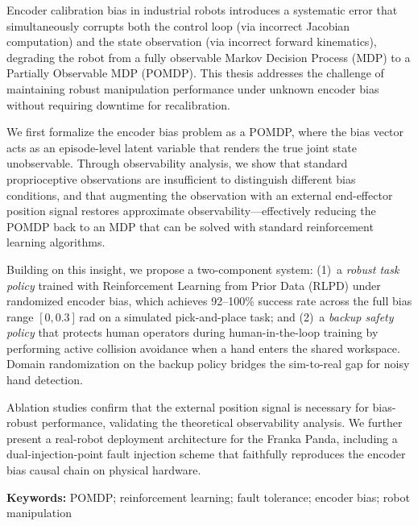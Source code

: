 
Encoder calibration bias in industrial robots introduces a systematic error that simultaneously corrupts both the control loop (via incorrect Jacobian computation) and the state observation (via incorrect forward kinematics), degrading the robot from a fully observable Markov Decision Process (MDP) to a Partially Observable MDP (POMDP). This thesis addresses the challenge of maintaining robust manipulation performance under unknown encoder bias without requiring downtime for recalibration.

We first formalize the encoder bias problem as a POMDP, where the bias vector acts as an episode-level latent variable that renders the true joint state unobservable. Through observability analysis, we show that standard proprioceptive observations are insufficient to distinguish different bias conditions, and that augmenting the observation with an external end-effector position signal restores approximate observability---effectively reducing the POMDP back to an MDP that can be solved with standard reinforcement learning algorithms.

Building on this insight, we propose a two-component system: (1)~a \emph{robust task policy} trained with Reinforcement Learning from Prior Data (RLPD) under randomized encoder bias, which achieves 92--100\% success rate across the full bias range $[0, 0.3]$\,rad on a simulated pick-and-place task; and (2)~a \emph{backup safety policy} that protects human operators during human-in-the-loop training by performing active collision avoidance when a hand enters the shared workspace. Domain randomization on the backup policy bridges the sim-to-real gap for noisy hand detection.

Ablation studies confirm that the external position signal is necessary for bias-robust performance, validating the theoretical observability analysis. We further present a real-robot deployment architecture for the Franka Panda, including a dual-injection-point fault injection scheme that faithfully reproduces the encoder bias causal chain on physical hardware.

\vspace{1em}
\noindent\textbf{Keywords:} POMDP; reinforcement learning; fault tolerance; encoder bias; robot manipulation
